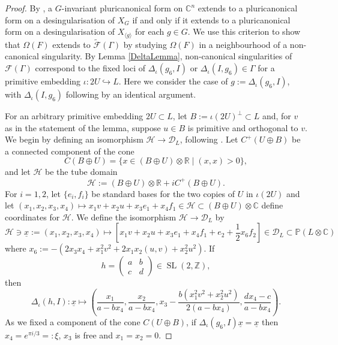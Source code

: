 \documentclass[12pt, a4paper]{article}
\newcommand{\RR}{\mathbb{R}}
\newcommand{\CC}{\mathbb{C}}
\newcommand{\ZZ}{\mathbb{Z}}
\newcommand{\PP}{\mathbb{P}}
\newcommand{\la}{\langle}
\newcommand{\ra}{\rangle}
\newcommand{\dc}{\mathcal{D}}
\newcommand{\fc}{\mathcal{F}}
\newcommand{\hc}{\mathcal{H}}
\newcommand{\opn}{\operatorname}
\newcommand{\op}{\oplus}
\newcommand{\bpm}{\begin{pmatrix}}
\newcommand{\epm}{\end{pmatrix}}
\begin{document}
\begin{proof}
  By \cite[Proposition 3.2]{Tai}, a $G$-invariant pluricanonical form on $\CC^n$ extends to a pluricanonical form on a desingularisation of $X_G$ if and only if it extends to a pluricanonical form on a desingularisation of $X_{\la g \ra}$ for each $g \in G$.
  We use this criterion to show that $\Omega(F)$ extends to $\widetilde{\fc}(\Gamma)$ by studying $\Omega(F)$ in  a neighbourhood of a non-canonical singularity. 
  By Lemma \ref{DeltaLemma}, non-canonical singularities of  $\fc(\Gamma)$ correspond to the fixed loci of $\Delta_{\iota}(g_6, I)$ or $\Delta_{\iota}(I, g_6) \in \Gamma$ for a primitive embedding $\iota:2U \hookrightarrow L$.
  Here we consider the case of $g:= \Delta_{\iota}(g_6, I)$, with $\Delta_{\iota}(I, g_6)$ following by an identical argument.
  
  For an arbitrary primitive embedding $2U \subset L$, let $B:=\iota(2U)^{\perp} \subset L$ and, for $v$ as in the statement of the lemma, suppose $u \in B$ is primitive and orthogonal to $v$.
  We begin by defining an isomorphism $\hc \rightarrow \dc_L$, following \cite[p.508]{Handbook}.
  Let $C^+(U \op B)$ be a connected component of the cone
  \[
  C(B \op U) =
  \{
  x \in (B \op U) \otimes \RR \mid (x,x)>0
  \},
  \]
  and let $\hc$ be the tube domain 
  \[
    \hc := (B \op U) \otimes \RR + i C^+(B \op U).
  \]
For $i=1,2$, let $\{e_i, f_i \}$ be standard bases for the two copies of $U$ in $\iota(2U)$ and let $(x_1, x_2, x_3, x_4) \mapsto x_1v + x_2u + x_3 e_1 + x_4 f_1 \in \hc \subset (B \op U) \otimes \CC$ define coordinates for $\hc$.
  We define the isomorphism $\hc \rightarrow \dc_L$  by 
  \[
  \hc \ni \underline{x}:=(x_1, x_2, x_3, x_4) \mapsto [x_1v + x_2 u + x_3 e_1 + x_4 f_1 + e_2 + \frac{1}{2}x_6 f_2 ] \in \dc_L \subset \PP(L \otimes \CC)
  \]
  where $x_6 := -(2x_3 x_4 + x_1^2v^2 + 2x_1x_2(u,v) + x_2^2u^2)$.
  If
\[
  h = \bpm a & b \\ c & d \epm \in \opn{SL}(2, \ZZ),
  \]
  then 
  \begin{equation}\label{GammaAction}
  \Delta_{\iota}(h, I):
  \underline{x} \mapsto
  \left(
  \frac{x_1}{a-bx_4}, \frac{x_2}{a-bx_4}, x_3 - \frac{b(x_1^2v^2 + x_2^2 u^2)}{2(a-bx_4)}, \frac{dx_4 - c}{a-bx_4}
  \right ).
  \end{equation}
  As we fixed a component of the cone $C(U \op B)$, if $\Delta_{\iota}(g_6, I) \underline{x} = \underline{x}$ then $x_4 = e^{\pi i /3}=:\xi$, $x_3$ is free and $x_1=x_2=0$.


\end{proof}
\end{document}
